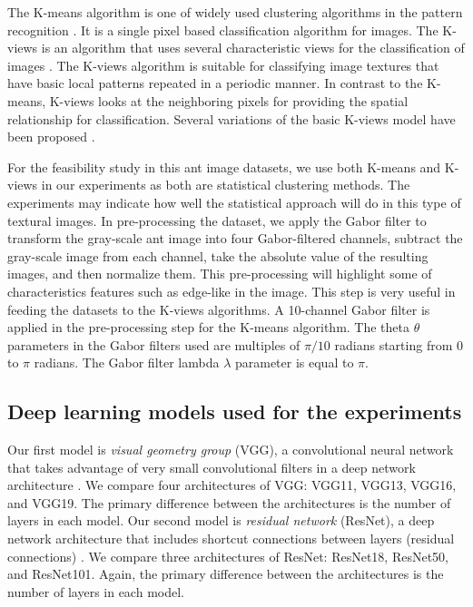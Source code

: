 \documentclass{aci}
\numberwithin{equation}{section}
\begin{document}
The K-means algorithm is one of widely used clustering algorithms in the pattern
recognition \cite{lloyd_least_1982}. It is a single pixel based classification
algorithm for images. The K-views is an algorithm that uses several
characteristic views for the classification of images \cite{hung_use_2002}. The
K-views algorithm is suitable for classifying image textures that have basic
local patterns repeated in a periodic manner. In contrast to the K-means,
K-views looks at the neighboring pixels for providing the spatial relationship
for classification.  Several variations of the basic K-views model have been
proposed \cite{yang_image_2003, lan_improved_2010}.

For the feasibility study in this ant image datasets, we use both K-means and
K-views in our experiments as both are statistical clustering methods. The
experiments may indicate how well the statistical approach will do in this type
of textural images. In pre-processing the dataset, we apply the Gabor filter to
transform the gray-scale ant image into four Gabor-filtered channels, subtract
the gray-scale image from each channel, take the absolute value of the resulting
images, and then normalize them. This pre-processing will highlight some of
characteristics features such as edge-like in the image. This step is very
useful in feeding the datasets to the K-views algorithms. A 10-channel Gabor
filter is applied in the pre-processing step for the K-means algorithm. The
theta $\theta$ parameters in the Gabor filters used are multiples of $\pi/10$
radians starting from $0$ to $\pi$ radians. The Gabor filter lambda $\lambda$
parameter is equal to $\pi$.

\subsection{Deep learning models used for the experiments}

Our first model is \textit{visual geometry group} (VGG), a convolutional neural
network that takes advantage of very small convolutional filters in a deep
network architecture \cite{simonyan_very_2015}. We compare four architectures of
VGG: VGG11, VGG13, VGG16, and VGG19. The primary difference between the
architectures is the number of layers in each model. Our second model is
\textit{residual network} (ResNet), a deep network architecture that includes
shortcut connections between layers (residual connections) \cite{he_deep_2015}.
We compare three architectures of ResNet: ResNet18, ResNet50, and ResNet101.
Again, the primary difference between the architectures is the number of layers
in each model.
\end{document}
